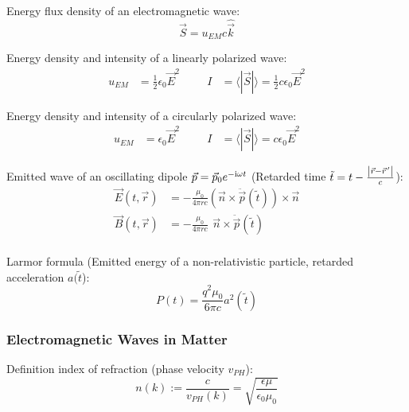 			\noindent
			Energy flux density of an electromagnetic wave:
			\begin{equation}
				\vec{S} = u_{EM}c\hat{\vec{k}}
			\end{equation}

			\noindent
			Energy density and intensity of a linearly polarized wave:
			\begin{equation}
				\begin{aligned}
					u_{EM} &= \frac{1}{2}\epsilon_0\vec{E}^2 &\hspace{20pt}
					I &= \langle|\vec{S}|\rangle = \frac{1}{2}c\epsilon_0\vec{E}^2
				\end{aligned}
			\end{equation}

			\noindent
			Energy density and intensity of a circularly polarized wave:
			\begin{equation}
				\begin{aligned}
					u_{EM} &= \epsilon_0\vec{E}^2 &\hspace{20pt}
					I &= \langle|\vec{S}|\rangle = c\epsilon_0\vec{E}^2
				\end{aligned}
			\end{equation}

			\noindent
			Emitted wave of an oscillating dipole $\vec{p} = \vec{p}_0 e^{-\mathrm{i}\omega t}$ (Retarded time $\tilde{t} = t-\frac{\left|\vec{r}-\pvec{r}'\right|}{c}$):
			\begin{equation}
				\begin{aligned}
					\vec{E}(t,\vec{r}) &= -\frac{\mu_0}{4\pi r c}	\left(\vec{n}\times\ddot{\vec{p}}(\tilde{t})\right) \times \vec{n} \\
					\vec{B}(t,\vec{r}) &= -\frac{\mu_0}{4\pi r c} \phantom{\Big(}\vec{n}\times\ddot{\vec{p}}(\tilde{t}) \\
				\end{aligned}
			\end{equation}

			\noindent
			Larmor formula (Emitted energy of a non-relativistic particle, retarded acceleration $a(\tilde{t}$):
			\begin{equation}
				P(t) = \frac{q^2 \mu_0}{6\pi c}a^2(\tilde{t})
			\end{equation}

		\subsubsection{Electromagnetic Waves in Matter}
			\noindent
			Definition index of refraction (phase velocity $v_{PH}$):
			\begin{equation}
				n(k) := \frac{c}{v_{PH}(k)} = \sqrt{\frac{\epsilon\mu}{\epsilon_0\mu_0}}
			\end{equation}

